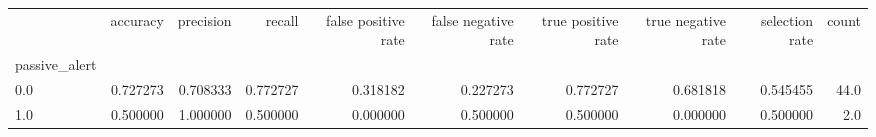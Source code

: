 \begin{tabular}{lrrrrrrrrr}
\toprule
{} &  accuracy &  precision &    recall &  false positive rate &  false negative rate &  true positive rate &  true negative rate &  selection rate &  count \\
passive\_alert &           &            &           &                      &                      &                     &                     &                 &        \\
\midrule
0.0           &  0.727273 &   0.708333 &  0.772727 &             0.318182 &             0.227273 &            0.772727 &            0.681818 &        0.545455 &   44.0 \\
1.0           &  0.500000 &   1.000000 &  0.500000 &             0.000000 &             0.500000 &            0.500000 &            0.000000 &        0.500000 &    2.0 \\
\bottomrule
\end{tabular}
